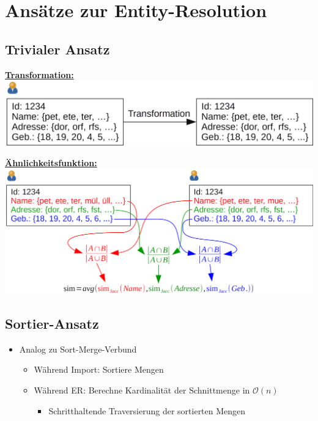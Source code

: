 \section{Ansätze zur Entity-Resolution}

\subsection{Trivialer Ansatz}
\begin{frame}
	\vspace*{-0.15cm}
	\hspace*{-.35cm} \textbf{\underline{Transformation:}}
	\includegraphics[width=1.01\textwidth]{Bilder/Transformation_Strings.png}
	\vspace*{0.35cm}

	\hspace*{-.35cm} \textbf{\underline{Ähnlichkeitsfunktion:}}
	\includegraphics[width=1.01\textwidth]{Bilder/sim_strings.png}
\end{frame}

\subsection{Sortier-Ansatz}
\begin{frame}
	\begin{itemize}
		\setlength\itemsep{\stdItemSep}
		\item Analog zu Sort-Merge-Verbund\footnotemark
		\begin{itemize}
			\setlength\itemsep{\stdItemSep}
			\vspace*{\stdItemSep}
			\item Während Import: Sortiere Mengen
			\item Während ER: Berechne Kardinalität der Schnittmenge in $\mathcal{O}(n)$
			\begin{itemize}
				\setlength\itemsep{\stdItemSep}
				\vspace*{\stdItemSep}
				\item Schritthaltende Traversierung der sortierten Mengen
			\end{itemize}
		\end{itemize}
	\end{itemize}

\end{frame}

